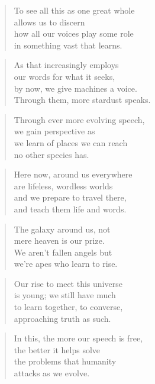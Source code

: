 \documentclass[10pt,a4paper]{article}
\begin{document}
\begin{paracol}{2}
\begin{verse}
To see all this as one great whole\\
allows us to discern\\
how all our voices play some role\\
in something vast that learns.
\end{verse}

\begin{verse}
As that increasingly employs\\
our words for what it seeks,\\
by now, we give machines a voice.\\
Through them, more stardust speaks.
\end{verse}

\begin{verse}
Through ever more evolving speech,\\
we gain perspective as\\
we learn of places we can reach\\
no other species has.
\end{verse}

\begin{verse}
Here now, around us everywhere\\
are lifeless, wordless worlds\\
and we prepare to travel there,\\
and teach them life and words.
\end{verse}

\begin{verse}
The galaxy around us, not\\
mere heaven is our prize.\\
We aren’t fallen angels but\\
we’re apes who learn to rise.
\end{verse}

\begin{verse}
Our rise to meet this universe\\
is young; we still have much\\
to learn together, to converse,\\
approaching truth as such.
\end{verse}

\begin{verse}
In this, the more our speech is free,\\
the better it helps solve\\
the problems that humanity\\
attacks as we evolve.
\end{verse}


\end{paracol}
\end{document}
